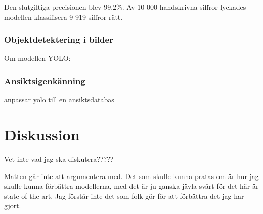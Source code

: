 \documentclass[a4paper,11pt,twoside]{article}
\begin{document}
Den slutgiltiga precisionen blev $99.2\%$. Av 10 000 handskrivna siffror lyckades modellen klassifisera 9 919 siffror rätt.

\subsubsection{Objektdetektering i bilder}
Om modellen YOLO:

\subsubsection{Ansiktsigenkänning}
anpassar yolo till en ansiktsdatabas

\section{Diskussion}
Vet inte vad jag ska diskutera?????

Matten går inte att argumentera med. Det som skulle kunna pratas om är hur jag skulle kunna förbättra modellerna, med det är ju ganska jävla svårt för det här är state of the art. Jag förstår inte det som folk gör för att förbättra det jag har gjort.
\end{document}
